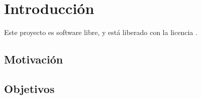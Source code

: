 \chapter{Introducción}

Este proyecto es software libre, y está liberado con la licencia \cite{gplv3}.

\section{Motivación}

\section{Objetivos}
